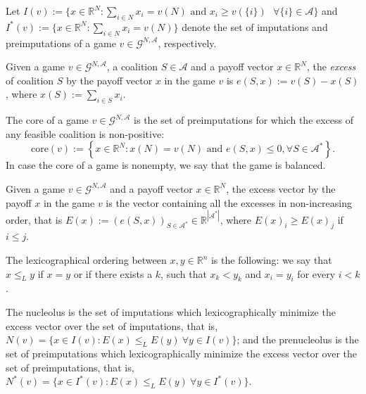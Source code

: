 \documentclass[a4paper,12pt]{article}
\theoremstyle{definition}
\theoremstyle{remark}
\begin{document}
Let $I(v) := \{ x\in \mathbb{R}^{N} \colon \sum_{i \in N}x_i = v(N) \text{ and } x_i\geq v(\{ i\} ) \text{ } \forall \{i\} \in \mathcal{A}\}$ and $I^*(v) := \{ x\in \mathbb{R}^{N} \colon \sum_{i \in N}x_i = v(N)\}$ denote the set of imputations and preimputations of a game $v \in \mathcal{G}^{N, \mathcal{A}}$, respectively. 

Given a game $v \in \mathcal{G}^{N,\mathcal{A}}$, a coalition $S \in \mathcal{A}$ and a payoff vector $x \in \mathbb{R}^N$, the \emph{excess} of coalition $S$ by the payoff vector $x$ in the game $v$ is $e (S, x) := v(S) -x(S)$, where $x(S) := \sum_{i\in S}x_i$.

The core of a game $v \in \mathcal{G}^{N,\mathcal{A}}$ is the set of preimputations for which the excess of any feasible coalition is non-positive:
\begin{equation*}
\text{core}(v) := \left\{ x\in \mathbb{R}^{N} \colon x (N) = v(N) \text{ and } e(S, x) \leq 0, \forall S \in \mathcal{A}^\ast \right\}.
\end{equation*}
In case the core of a game is nonempty, we say that the game is balanced.

Given a game $v \in \mathcal{G}^{N,\mathcal{A}}$ and a payoff vector $x \in \mathbb{R}^N$, the excess vector by the payoff $x$ in the game $v$ is the vector containing all the excesses in non-increasing order, that is $E(x) := (e (S,x))_{S \in \mathcal{A}^\ast} \in \mathbb{R}^{|\mathcal{A}^\ast|}$, where $E (x)_i \geq E(x)_j$ if $i \leq j$.

The lexicographical ordering between $x, y \in \mathbb{R}^n$ is the following: we say that $x \leq _L y$ if $x=y$ or if there exists a $k$, such that $x_k < y_k$ and $x_i = y_i$ for every $i<k$. 

The nucleolus is the set of imputations which lexicographically minimize the excess vector over the set of imputations, that is, $N(v) = \{ x \in I(v) \colon E(x) \leq _L E(y) \ \forall y\in I(v) \}$; and the prenucleolus is the set of preimputations which lexicographically minimize the excess vector over the set of preimputations, that is, $N^*(v) = \{ x \in I^*(v) \colon E(x) \leq _L E(y) \ \forall y\in I^*(v) \}$.
\end{document}
